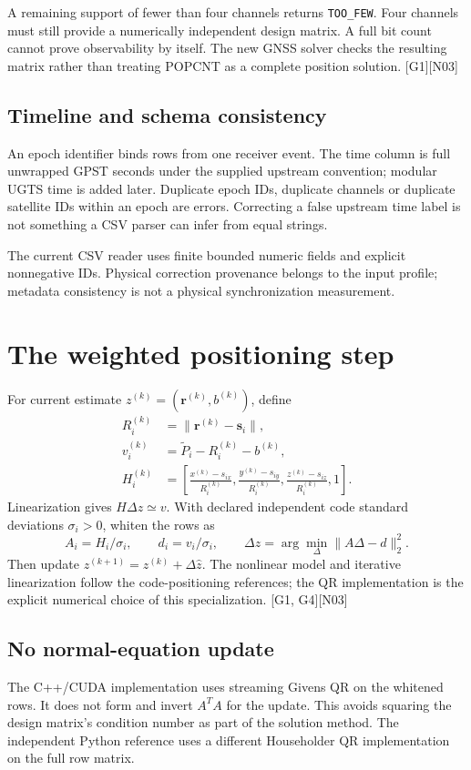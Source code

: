 \documentclass[11pt,a4paper]{article}
\newcommand{\code}[1]{\texttt{#1}}
\newcommand{\ext}[1]{\textcolor{muted}{[#1]}}
\newcommand{\dec}[1]{\textcolor{accent}{[N#1]}}
\begin{document}
A remaining support of fewer than four channels returns \code{TOO\_FEW}. Four channels
must still provide a numerically independent design matrix. A full bit count cannot
prove observability by itself. The new GNSS solver checks the resulting matrix rather
than treating POPCNT as a complete position solution. \ext{G1}\dec{03}

\subsection{Timeline and schema consistency}
An epoch identifier binds rows from one receiver event. The time column is full
unwrapped GPST seconds under the supplied upstream convention; modular UGTS time is
added later. Duplicate epoch IDs, duplicate channels or duplicate satellite IDs within
an epoch are errors. Correcting a false upstream time label is not something a CSV
parser can infer from equal strings.

The current CSV reader uses finite bounded numeric fields and explicit nonnegative
IDs. Physical correction provenance belongs to the input profile; metadata consistency
is not a physical synchronization measurement.
\clearpage

\section{The weighted positioning step}
For current estimate $z^{(k)}=(\boldsymbol r^{(k)},b^{(k)})$, define
\begin{align}
R_i^{(k)}&=\|\boldsymbol r^{(k)}-\boldsymbol s_i\|,\\
v_i^{(k)}&=\widetilde P_i-R_i^{(k)}-b^{(k)},\\
H_i^{(k)}&=\left[\frac{x^{(k)}-s_{ix}}{R_i^{(k)}},
\frac{y^{(k)}-s_{iy}}{R_i^{(k)}},
\frac{z^{(k)}-s_{iz}}{R_i^{(k)}},1\right].
\end{align}
Linearization gives $H\Delta z\simeq v$. With declared independent code standard
deviations $\sigma_i>0$, whiten the rows as
\begin{equation}
A_i=H_i/\sigma_i,\qquad d_i=v_i/\sigma_i,
\qquad\Delta\widehat z=\arg\min_\Delta\|A\Delta-d\|_2^2.
\end{equation}
Then update $z^{(k+1)}=z^{(k)}+\Delta\widehat z$. The nonlinear model and iterative
linearization follow the code-positioning references; the QR implementation is the
explicit numerical choice of this specialization. \ext{G1, G4}\dec{03}

\subsection{No normal-equation update}
The C++/CUDA implementation uses streaming Givens QR on the whitened rows. It does
not form and invert $A^TA$ for the update. This avoids squaring the design matrix's
condition number as part of the solution method. The independent Python reference
uses a different Householder QR implementation on the full row matrix.
\end{document}
